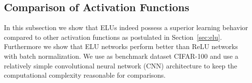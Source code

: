 \documentclass{article}
\begin{document}
\subsection{Comparison of Activation Functions}
\label{sec:compFunctions}

In this subsection we show that ELUs indeed possess a superior
learning behavior compared to other activation functions as
postulated in Section~\ref{sec:elu}.
Furthermore we show that ELU networks perform better than ReLU
networks with batch normalization.
We use as benchmark dataset CIFAR-100 and use a relatively
simple convolutional neural network (CNN) architecture to keep the
computational complexity reasonable for comparisons.


\begin{figure}[!ht]
\begin{center}
\\[-2.0ex]

\end{center}
\end{figure}
\end{document}
